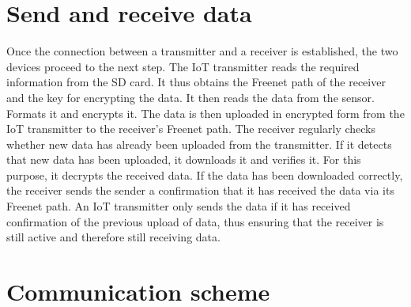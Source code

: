 \section{Send and receive data}
Once the connection between a transmitter and a receiver is established, the two devices proceed to the next step. The IoT transmitter reads the required information from the SD card. It thus obtains the Freenet path of the receiver and the key for encrypting the data. 
It then reads the data from the sensor. Formats it and encrypts it. The data is then uploaded in encrypted form from the IoT transmitter to the receiver's Freenet path.
The receiver regularly checks whether new data has already been uploaded from the transmitter. If it detects that new data has been uploaded, it downloads it and verifies it. For this purpose, it decrypts the received data.  If the data has been downloaded correctly, the receiver sends the sender a confirmation that it has received the data via its Freenet path.
\newline
An IoT transmitter only sends the data if it has received confirmation of the previous upload of data, thus ensuring that the receiver is still active and therefore still receiving data.
\newpage
\section{Communication scheme}
\begin{center}
\end{center}